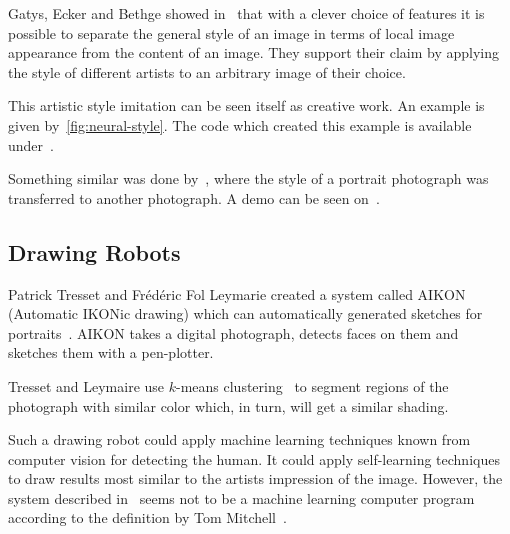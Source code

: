 Gatys, Ecker and Bethge showed in~\cite{gatys2015neural} that with a clever
choice of features it is possible to separate the general style of an image in
terms of local image appearance from the content of an image. They support
their claim by applying the style of different artists to an arbitrary image of
their choice.

This artistic style imitation can be seen itself as creative work. An example
is given by~\cref{fig:neural-style}. The code which created this example is
available under~\cite{Johnson2016}.

Something similar was done by~\cite{shih2014style}, where the style of a
portrait photograph was transferred to another photograph. A demo can be seen
on~\cite{Shih2014}.


\subsection{Drawing Robots}
Patrick Tresset and Fr\'{e}d\'{e}ric Fol Leymarie created a system called AIKON
(Automatic IKONic drawing) which can automatically generated sketches for
portraits~\cite{tresset2005generative}. AIKON takes a digital photograph,
detects faces on them and sketches them with a pen-plotter.

Tresset and Leymaire use $k$-means clustering~\cite{1017616} to segment regions
of the photograph with similar color which, in turn, will get a similar
shading.

Such a drawing robot could apply machine learning techniques known from
computer vision for detecting the human. It could apply self-learning
techniques to draw results most similar to the artists impression of the image.
However, the system described in~\cite{tresset2005generative} seems not to be a
machine learning computer program according to the definition by Tom
Mitchell~\cite{Mitchell97}.
